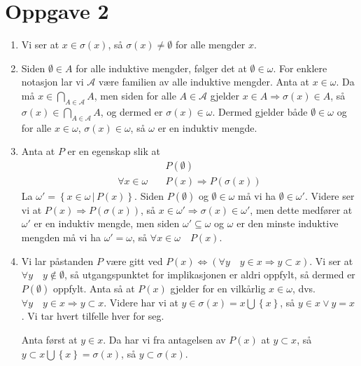 \documentclass{article}[norsk]
\begin{document}
\section*{Oppgave 2}
\begin{enumerate}[label=(\roman*)]
	\item Vi ser at $ x\in\sigma(x)$, så $\sigma(x)\neq\emptyset$ for alle mengder $x$.
    \item Siden $\emptyset\in A$ for alle induktive mengder, følger det at $\emptyset\in\omega$. For enklere notasjon lar vi $\mathcal{A}$ være familien av alle induktive mengder. Anta at $x\in\omega$. Da må $x\in\bigcap_{A\in\mathcal{A}}A$, men siden for alle $A\in\mathcal{A}$ gjelder $x\in A\Rightarrow\sigma(x)\in A$, så $\sigma(x)\in\bigcap_{A\in\mathcal{A}}A$, og dermed er $\sigma(x)\in\omega$. Dermed gjelder både $\emptyset\in\omega$ og for alle $x\in\omega$, $\sigma(x)\in\omega$, så $\omega$ er en induktiv mengde.
    \item Anta at $P$ er en egenskap slik at 
    \begin{equation*} \begin{aligned}
    	&P(\emptyset)\\
        \forall x \in \omega \quad &P(x) \Rightarrow P(\sigma(x))
    \end{aligned} \end{equation*}
	La $\omega'=\left\{x\in\omega\,|\,P(x)\right\}$. Siden $P(\emptyset)$ og $\emptyset\in\omega$ må vi ha $\emptyset\in\omega '$. Videre ser vi at $P(x)\Rightarrow P(\sigma(x))$, så $x\in\omega'\Rightarrow \sigma(x)\in\omega'$, men dette medfører at $\omega'$ er en induktiv mengde, men siden $\omega'\subseteq \omega$ og $\omega$ er den minste induktive mengden må vi ha $\omega'=\omega$, så $\forall x \in\omega\quad P(x)$.
    
    \item Vi lar påstanden $P$ være gitt ved $P(x) \Longleftrightarrow \left(\forall y\quad y \in x \Rightarrow  y\subset x\right)$. 
    Vi ser at $\forall y\quad y\notin\emptyset$, så utgangspunktet for implikasjonen er aldri oppfylt, så dermed er $P(\emptyset)$ oppfylt.
    Anta så at $P(x)$ gjelder for en vilkårlig $x\in\omega$, dvs. $\forall y\quad y \in x \Rightarrow y\subset x$. Videre har vi at  $y\in\sigma(x)=x \bigcup \left\{x\right\}$, så $y\in x \vee y= x$. Vi tar hvert tilfelle hver for seg. 
    
    Anta først at $y \in x$. Da har vi fra antagelsen av $P(x)$ at $y\subset x$, så $y\subset x\bigcup \left\{x\right\}=\sigma(x)$, så $y\subset\sigma(x)$.
    

\end{enumerate}
\end{document}
